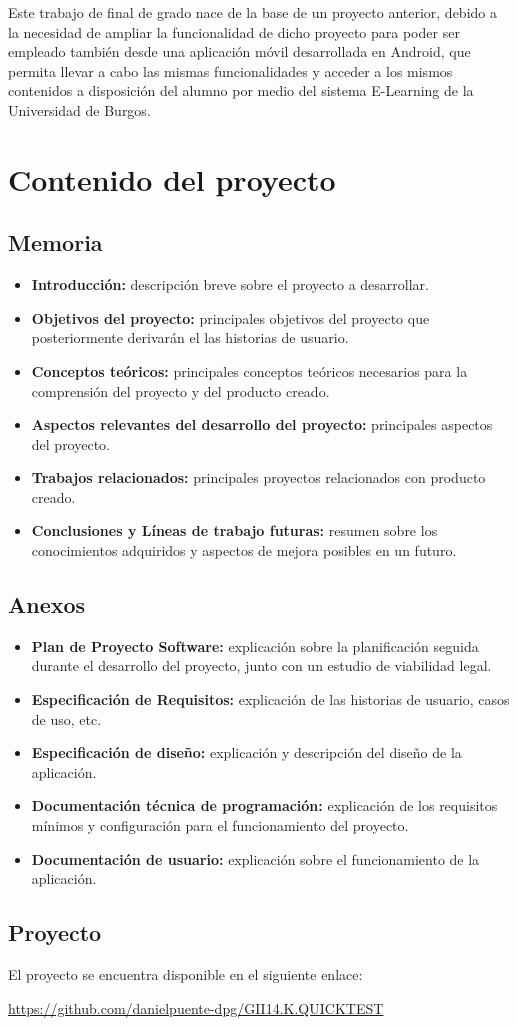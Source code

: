 

Este trabajo de final de grado nace de la base de un proyecto anterior, debido a la necesidad de ampliar la funcionalidad de dicho proyecto para poder ser empleado también desde una aplicación móvil desarrollada en Android, que permita llevar a cabo las mismas funcionalidades y acceder a los mismos contenidos a disposición del alumno por medio del sistema E-Learning de la Universidad de Burgos.

\section{Contenido del proyecto}

\subsection{Memoria}
\begin{itemize}
	\item \textbf{Introducción:} descripción breve sobre el proyecto a desarrollar.
	\item \textbf{Objetivos del proyecto:} principales objetivos del proyecto que posteriormente derivarán el las historias de usuario.
	\item \textbf{Conceptos teóricos:} principales conceptos teóricos necesarios para la comprensión del proyecto y del producto creado.
	\item \textbf{Aspectos relevantes del desarrollo del proyecto:} principales aspectos del proyecto.
	\item \textbf{Trabajos relacionados:} principales proyectos relacionados con producto creado.
	\item \textbf{Conclusiones y Líneas de trabajo futuras:} resumen sobre los conocimientos adquiridos y aspectos de mejora posibles en un futuro.
	
\end{itemize}

\subsection{Anexos}

\begin{itemize}
	\item \textbf{Plan de Proyecto Software:} explicación sobre la planificación seguida durante el desarrollo del proyecto, junto con un estudio de viabilidad legal.
	\item \textbf{Especificación de Requisitos:} explicación de las historias de usuario, casos de uso, etc.
	\item \textbf{Especificación de diseño:} explicación y descripción del diseño de la aplicación.
	\item \textbf{Documentación técnica de programación:} explicación de los requisitos mínimos y configuración para el funcionamiento del proyecto.
	\item \textbf{Documentación de usuario:} explicación sobre el funcionamiento de la aplicación.
	
\end{itemize}

\subsection{Proyecto}

El proyecto se encuentra disponible en el siguiente enlace:

\url{https://github.com/danielpuente-dpg/GII14.K.QUICKTEST}


